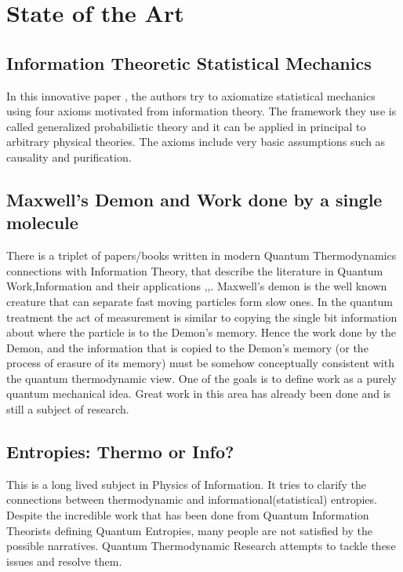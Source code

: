 \documentclass[a4paper,12pt]{article}
\begin{document}
\section{State of the Art}
\subsection*{Information Theoretic Statistical Mechanics}
In this innovative paper \cite{chiribella2016entanglement}, the authors try to axiomatize statistical mechanics using four axioms motivated from information theory. The framework they use is called generalized probabilistic theory and it can be applied in principal to arbitrary physical theories. The axioms include very basic assumptions such as causality and purification.
\subsection*{Maxwell's Demon and Work done by a single molecule}
There is a triplet of papers/books written in modern Quantum Thermodynamics connections with Information Theory, that describe the literature in Quantum Work,Information and their applications \citep{deffner2019quantum},\citep{vinjanampathy2016quantum},\citep{goold2016role}. Maxwell's demon is the well known creature that can separate fast moving particles form slow ones. In the quantum treatment the act of measurement is similar to copying the single bit information
about where the particle is to the Demon’s memory. Hence the work done by the Demon, and the information that is copied to the Demon's memory (or the process of erasure of its memory) must be somehow conceptually consistent with the quantum thermodynamic view. One of the goals is to define work as a purely quantum mechanical idea. Great work in this area has already been done and is still a subject of research.
\subsection*{Entropies: Thermo or Info?}
This is a long lived subject in Physics of Information. It tries to clarify the connections between thermodynamic and informational(statistical) entropies. Despite the incredible work that has been done from Quantum Information Theorists defining Quantum Entropies, many people are not satisfied by the possible narratives. Quantum Thermodynamic Research attempts to tackle these issues and resolve them.
\end{document}
